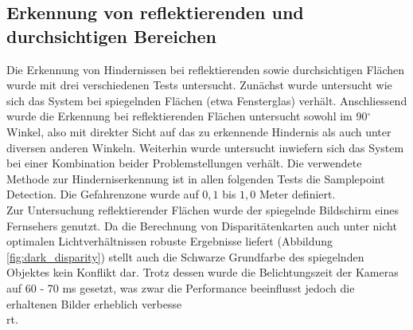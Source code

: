 \subsection{Erkennung von reflektierenden und durchsichtigen Bereichen}
\label{subsec:test_reflection_translucency}

Die Erkennung von Hindernissen bei reflektierenden sowie durchsichtigen Flächen wurde mit drei verschiedenen Tests untersucht. Zunächst wurde untersucht wie sich das System bei spiegelnden Flächen (etwa Fensterglas) verhält. Anschliessend wurde die Erkennung bei reflektierenden Flächen untersucht sowohl im 90$^\circ$ Winkel, also mit direkter Sicht auf das zu erkennende Hindernis als auch unter diversen anderen Winkeln. Weiterhin wurde untersucht inwiefern sich das System bei einer Kombination beider Problemstellungen verhält. Die verwendete Methode zur Hinderniserkennung ist in allen folgenden Tests die Samplepoint Detection. Die Gefahrenzone wurde auf $0,1$ bis $1,0$ Meter definiert.\\

\noindent
Zur Untersuchung reflektierender Flächen wurde der spiegelnde Bildschirm eines Fernsehers genutzt. Da die Berechnung von Disparitätenkarten auch unter nicht optimalen Lichtverhältnissen robuste Ergebnisse liefert (Abbildung \ref{fig:dark_disparity}) stellt auch die Schwarze Grundfarbe des spiegelnden Objektes kein Konflikt dar. Trotz dessen wurde die Belichtungszeit der Kameras auf 60 - 70 ms gesetzt, was zwar die Performance beeinflusst jedoch die erhaltenen Bilder erheblich verbesse\\rt.

